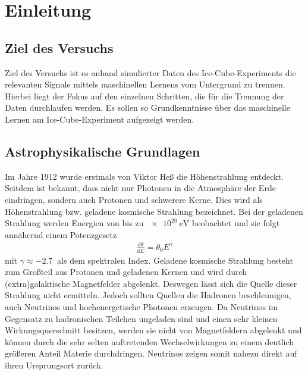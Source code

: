 \section{Einleitung}
\label{sec:Theorie}
\subsection{Ziel des Versuchs}
\label{sec:Ziel}
Ziel des Versuchs ist es anhand simulierter Daten des Ice-Cube-Experiments die relevanten Signale mittels maschinellen Lernens vom Untergrund zu trennen.
Hierbei liegt der Fokus auf den einzelnen Schritten, die für die Trennung der Daten durchlaufen werden.
Es sollen so Grundkenntnisse über das maschinelle Lernen am Ice-Cube-Experiment aufgezeigt werden.

\subsection{Astrophysikalische Grundlagen}
\label{sec:GrundlagenATP}
Im Jahre 1912 wurde erstmals von Viktor Heß die Höhenstrahlung entdeckt.
Seitdem ist bekannt, dass nicht nur Photonen in die Atmosphäre der Erde eindringen, sondern auch Protonen und schwerere Kerne.
Dies wird als Höhenstrahlung bzw. geladene kosmische Strahlung bezeichnet.
Bei der geladenen Strahlung werden Energien von bis zu $\SI{e20}{\electronvolt}$ beobachtet und sie folgt annähernd einem Potenzgesetz
\begin{align*}
	\frac{\mathrm{d}\theta}{\mathrm{d}E} = \theta _0 E^\gamma
\end{align*}
mit $\gamma \approx -\SI{2.7}{}$ als dem spektralen Index.
Geladene kosmische Strahlung besteht zum Großteil aus Protonen und geladenen Kernen und wird durch (extra)galaktische Magnetfelder abgelenkt.
Deswegen lässt sich die Quelle dieser Strahlung nicht ermitteln.
Jedoch sollten Quellen die Hadronen beschleunigen, auch Neutrinos und hochenergetische Photonen erzeugen.
Da Neutrinos im Gegensatz zu hadronischen Teilchen ungeladen sind und einen sehr kleinen Wirkungsquerschnitt besitzen, werden sie nicht von Magnetfeldern abgelenkt und können durch die sehr selten auftretenden Wechselwirkungen zu einem deutlich größeren Anteil Materie durchdringen.
Neutrinos zeigen somit nahezu direkt auf ihren Ursprungsort zurück. 


